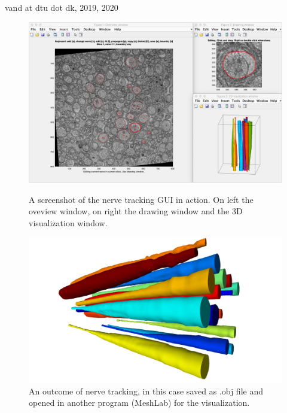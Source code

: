 \documentclass[paper=a4, fontsize=8pt]{article}
\begin{document}
\noindent vand at dtu dot dk, 2019, 2020

\newpage
	
	\begin{figure}
		\centering
		\includegraphics[width=0.9\linewidth]{../images/mouse_nerve_screenshot}
		\caption{A screenshot of the nerve tracking GUI in action. On left the oveview window, on right the drawing window and the 3D visualization window.}
		\label{fig:guiscreenshot}
		\vspace{3\baselineskip}
		\includegraphics[width=\linewidth]{../images/EM_mouse_meshes_screenshot}
		\caption{An outcome of nerve tracking, in this case saved as .obj file and opened in another program (MeshLab) for the visualization.}
		\label{fig:mousenerves}
	\end{figure}
\end{document}
